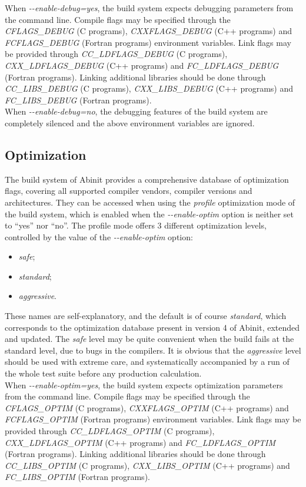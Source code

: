 When \textit{\hbox{-{-}enable-debug=yes}}, the build system expects
debugging parameters from the command line. Compile flags may be specified
through the \textit{CFLAGS\_DEBUG} (C programs), \textit{CXXFLAGS\_DEBUG}
(C++ programs) and \textit{FCFLAGS\_DEBUG} (Fortran programs) environment
variables. Link flags may be provided through \textit{CC\_LDFLAGS\_DEBUG}
(C programs), \textit{CXX\_LDFLAGS\_DEBUG} (C++ programs) and \textit{FC\_LDFLAGS\_DEBUG}
(Fortran programs). Linking additional libraries should be done through
\textit{CC\_LIBS\_DEBUG} (C programs), \textit{CXX\_LIBS\_DEBUG} (C++
programs) and \textit{FC\_LIBS\_DEBUG} (Fortran programs).\\


When \textit{\hbox{-{-}enable-debug=no}}, the debugging features
of the build system are completely silenced and the above environment
variables are ignored.


\subsection{Optimization}

The build system of Abinit provides a comprehensive database of optimization
flags, covering all supported compiler vendors, compiler versions
and architectures. They can be accessed when using the \textit{profile}
optimization mode of the build system, which is enabled when the \textit{\hbox{-{-}enable-optim}}
option is neither set to {}``yes'' nor {}``no''. The profile mode
offers 3 different optimization levels, controlled by the value of
the\textit{ \hbox{-{-}enable-optim}} option: 
\begin{itemize}
\item \textit{safe}; 
\item \textit{standard}; 
\item \textit{aggressive}.
\end{itemize}
These names are self-explanatory, and the default is of course \textit{standard},
which corresponds to the optimization database present in version
4 of Abinit, extended and updated. The \textit{safe} level may be
quite convenient when the build fails at the standard level, due to
bugs in the compilers. It is obvious that the \textit{aggressive}
level should be used with extreme care, and systematically accompanied
by a run of the whole test suite before any production calculation.\\


When \textit{\hbox{-{-}enable-optim=yes}}, the build system expects
optimization parameters from the command line. Compile flags may be
specified through the \textit{CFLAGS\_OPTIM} (C programs), \textit{CXXFLAGS\_OPTIM}
(C++ programs) and \textit{FCFLAGS\_OPTIM} (Fortran programs) environment
variables. Link flags may be provided through \textit{CC\_LDFLAGS\_OPTIM}
(C programs), \textit{CXX\_LDFLAGS\_OPTIM} (C++ programs) and \textit{FC\_LDFLAGS\_OPTIM}
(Fortran programs). Linking additional libraries should be done through
\textit{CC\_LIBS\_OPTIM} (C programs), \textit{CXX\_LIBS\_OPTIM} (C++
programs) and \textit{FC\_LIBS\_OPTIM} (Fortran programs).\\


